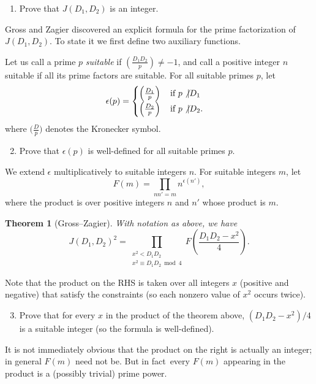 \documentclass[11pt]{article}
\newcommand{\kron}[2]{\bigl(\frac{#1}{#2}\bigr)}
\newtheorem*{theorem}{Theorem}
\begin{document}
\begin{enumerate}[{\bf (a)}]
\item Prove that $J(D_1,D_2)$ is an integer.
\end{enumerate}

\noindent
Gross and Zagier discovered an explicit formula for the prime factorization of $J(D_1,D_2)$.  To state it we first define two auxiliary functions.

Let us call a prime $p$ \emph{suitable} if $\left(\frac{D_1D_2}{p}\right)\ne -1$, and call a positive integer $n$ suitable if all its prime factors are suitable.
For all suitable primes $p$, let
\[
\epsilon(p) = \begin{cases}
\left(\frac{D_1}{p}\right)\quad\text{if $p\not\vert D_1$}\\
\left(\frac{D_2}{p}\right)\quad\text{if $p\not\vert D_2$}.
\end{cases}
\]
where $\kron{D}{p}$ denotes the Kronecker symbol.
\begin{enumerate}[{\bf (a)}]
\setcounter{enumi}{1}
\item Prove that $\epsilon(p)$ is well-defined for all suitable primes $p$.
\end{enumerate}
We extend $\epsilon$ multiplicatively to suitable integers $n$.
For suitable integers $m$, let
\[
F(m) = \prod_{nn'=m}n^{\epsilon(n')},
\]
where the product is over positive integers $n$ and $n'$ whose product is $m$.
\begin{theorem}[Gross--Zagier]\label{thm:GZ}
With notation as above, we have
\[
J(D_1,D_2)^2 = \prod_{\substack{x^2<D_1D_2\\ x^2\equiv D_1D_2\bmod 4}} F\left(\frac{D_1D_2-x^2}{4}\right).
\]
\end{theorem}

Note that the product on the RHS is taken over all integers $x$ (positive and negative) that satisfy the constraints (so each nonzero value of $x^2$ occurs twice).

\begin{enumerate}[{\bf (a)}]
\setcounter{enumi}{2}
\item Prove that for every $x$ in the product of the theorem above, $(D_1D_2-x^2)/4$ is a suitable integer (so the formula is well-defined).
\end{enumerate}

It is not immediately obvious that the product on the right is actually an integer; in general $F(m)$ need not be.
But in fact\ every $F(m)$ appearing in the product is a (possibly trivial) prime power.
\end{document}
